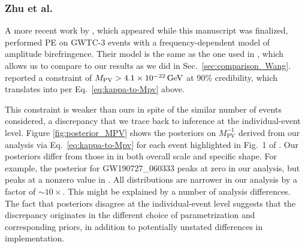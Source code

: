 \documentclass[aps,prd,twocolumn,superscriptaddress,preprintnumbers,nofootinbib]{revtex4-2}
\begin{document}
\subsubsection{Zhu et al.}
\label{sec:comparison_Zhu}

A more recent work by \citet{Zhu:2023wci}, which appeared while this manuscript was finalized, performed \ac{PE} on GWTC-3 events with a frequency-dependent model of amplitude birefringence.
Their model is the same as the one used in \citet{Wang_2021}, which allows us to compare to our results as we did in Sec.~\ref{sec:comparison_Wang}.
\citet{Zhu:2023wci} reported a constraint of $M_{\rm PV} > 4.1 \times 10^{-22}\, {\rm GeV}$ at 90\% credibility, which translates into  per Eq.~\eqref{eq:kappa-to-Mpv} above.

This constraint is weaker than ours in spite of the similar number of events considered, a discrepancy that we trace back to inference at the individual-event level.
Figure \ref{fig:posterior_MPV} shows the posteriors on $M_\mathrm{PV}^{-1}$ derived from our analysis via Eq.~\eqref{eq:kappa-to-Mpv} for each event highlighted in Fig.~1 of \citet{Zhu:2023wci}.
Our posteriors differ from those in \citet{Zhu:2023wci} in both overall scale and specific shape.
For example, the posterior for GW190727\_060333 peaks at zero in our analysis, but peaks at a nonzero value in \citet{Zhu:2023wci}.
All distributions are narrower in our analysis by a factor of ${\sim}10\times$.
This might be explained by a number of analysis differences.
The fact that posteriors disagree at the individual-event level suggests that the discrepancy originates in the different choice of parametrization and corresponding priors, in addition to potentially unstated differences in implementation.

\end{document}
